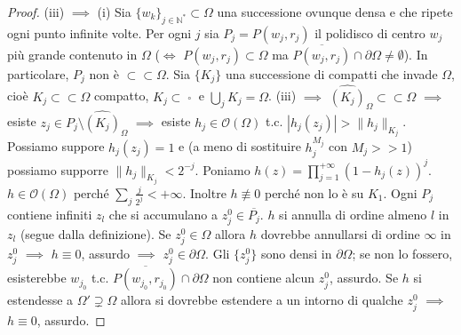 \begin{proof}
  (iii) $\implies$ (i) Sia $\{w_k\}_{j \in \mathbb{N}^*} \subset \Omega$ una successione ovunque densa e che ripete ogni punto infinite volte. Per ogni $j$ sia $P_j=P(w_j,r_j)$ il polidisco di centro $w_j$ più grande contenuto in $\Omega$ ($\iff$ $P(w_j,r_j) \subset \Omega$ ma $\overline{P(w_j,r_j)}\cap\partial\Omega\not=\emptyset$). In particolare, $P_j$ non è $\subset\subset\Omega$.
  Sia $\{K_j\}$ una successione di compatti che invade $\Omega$, cioè $K_j \subset\subset \Omega$ compatto, $K_j \subset \mathop {K_{j+1}}\limits^ \circ$ e $\displaystyle \bigcup_j K_j=\Omega$.
  (iii) $\implies$ $\widehat{(K_j)}_\Omega \subset\subset \Omega$ $\implies$ esiste $z_j \in P_j\setminus\widehat{(K_j)}_\Omega$ $\implies$ esiste $h_j \in \mathcal{O}(\Omega)$ t.c. $|h_j(z_j)|>\|h_j\|_{K_j}$. Possiamo suppore $h_j(z_j)=1$ e (a meno di sostituire $h_j^{M_j}$ con $M_j>>1$) possiamo supporre $\|h_j\|_{K_j}<2^{-j}$.
  Poniamo $\displaystyle h(z)=\prod_{j=1}^{+\infty} (1-h_j(z))^j$. $h \in \mathcal{O}(\Omega)$ perché $\displaystyle \sum_j \frac{j}{2^j}<+\infty$. Inoltre $h \not\equiv 0$ perché non lo è su $K_1$. Ogni $P_j$ contiene infiniti $z_l$ che si accumulano a $z_j^0 \in \overline{P_j}$.
  $h$ si annulla di ordine almeno $l$ in $z_l$ (segue dalla definizione). Se $z_j^0 \in \Omega$ allora $h$ dovrebbe annullarsi di ordine $\infty$ in $z_j^0$ $\implies$ $h \equiv 0$, assurdo $\implies$ $z_j^0 \in \partial\Omega$.
  Gli $\{z_j^0\}$ sono densi in $\partial\Omega$; se non lo fossero, esisterebbe $w_{j_0}$ t.c. $\overline{P(w_{j_0},r_{j_0})} \cap \partial\Omega$ non contiene alcun $z_j^0$, assurdo. Se $h$ si estendesse a $\Omega' \supsetneq \Omega$ allora si dovrebbe estendere a un intorno di qualche $z_j^0$ $\implies$ $h \equiv 0$, assurdo.


\end{proof}
